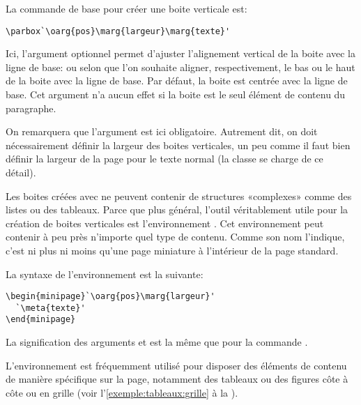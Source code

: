 La commande de base pour créer une boite verticale est:
\begin{lstlisting}
\parbox`\oarg{pos}\marg{largeur}\marg{texte}'
\end{lstlisting}
Ici, l'argument optionnel  permet d'ajuster l'alignement
vertical de la boite avec la ligne de base:  ou  selon
que l'on souhaite aligner, respectivement, le bas ou le haut de la
boite avec la ligne de base. Par défaut, la boite est centrée avec la
ligne de base. Cet argument n'a aucun effet si la boite est le seul
élément de contenu du paragraphe.

On remarquera que l'argument  est ici obligatoire.
Autrement dit, on doit nécessairement définir la largeur des boites
verticales, un peu comme il faut bien définir la largeur de la page
pour le texte normal (la classe se charge de ce détail).

Les boites créées avec \cmd{\parbox} ne peuvent contenir de structures
«complexes» comme des listes ou des tableaux. Parce que plus général,
l'outil véritablement utile pour la création de boites verticales est
l'environnement . Cet environnement peut contenir à peu près
n'importe quel type de contenu. Comme son nom l'indique, c'est ni plus
ni moins qu'une page miniature à l'intérieur de la page standard.

La syntaxe de l'environnement  est la suivante:
\begin{lstlisting}
\begin{minipage}`\oarg{pos}\marg{largeur}'
  `\meta{texte}'
\end{minipage}
\end{lstlisting}
La signification des arguments  et  est la
même que pour la commande .

L'environnement  est fréquemment utilisé pour disposer
des éléments de contenu de manière spécifique sur la page, notamment
des tableaux ou des figures côte à côte ou en grille (voir
l'\autoref{exemple:tableaux:grille} à la
).

